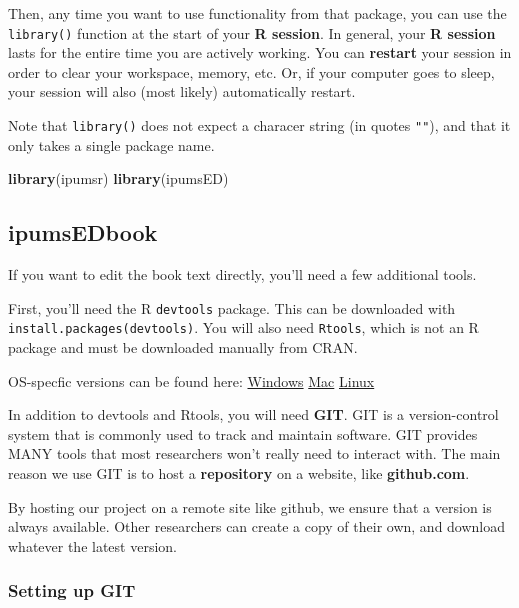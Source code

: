 \documentclass[
]{book}
\newenvironment{Shaded}{\begin{snugshade}}{\end{snugshade}}
\newcommand{\FunctionTok}[1]{\textcolor[rgb]{0.13,0.29,0.53}{\textbf{#1}}}
\newcommand{\NormalTok}[1]{#1}
\begin{document}
Then, any time you want to use functionality from that package, you can use the \texttt{library()} function at the start of your \textbf{R session}. In general, your \textbf{R session} lasts for the entire time you are actively working. You can \textbf{restart} your session in order to clear your workspace, memory, etc. Or, if your computer goes to sleep, your session will also (most likely) automatically restart.

Note that \texttt{library()} does not expect a characer string (in quotes \texttt{""}), and that it only takes a single package name.

\begin{Shaded}
\begin{Highlighting}[]
\FunctionTok{library}\NormalTok{(ipumsr)}
\FunctionTok{library}\NormalTok{(ipumsED)}
\end{Highlighting}
\end{Shaded}

\hypertarget{ipumsedbook}{%
\subsection{ipumsEDbook}\label{ipumsedbook}}

If you want to edit the book text directly, you'll need a few additional tools.

First, you'll need the R \texttt{devtools} package. This can be downloaded with \texttt{install.packages(devtools)}. You will also need \texttt{Rtools}, which is not an R package and must be downloaded manually from CRAN.

OS-specfic versions can be found here:
\href{https://cran.r-project.org/bin/windows/Rtools/}{Windows}
\href{https://cran.r-project.org/bin/macosx/tools/}{Mac}
\href{https://cran.r-project.org/bin/linux/}{Linux}

In addition to devtools and Rtools, you will need \textbf{GIT}. GIT is a version-control system that is commonly used to track and maintain software. GIT provides MANY tools that most researchers won't really need to interact with. The main reason we use GIT is to host a \textbf{repository} on a website, like \textbf{github.com}.

By hosting our project on a remote site like github, we ensure that a version is always available. Other researchers can create a copy of their own, and download whatever the latest version.

\hypertarget{setting-up-git}{%
\subsubsection{Setting up GIT}\label{setting-up-git}}
\end{document}
